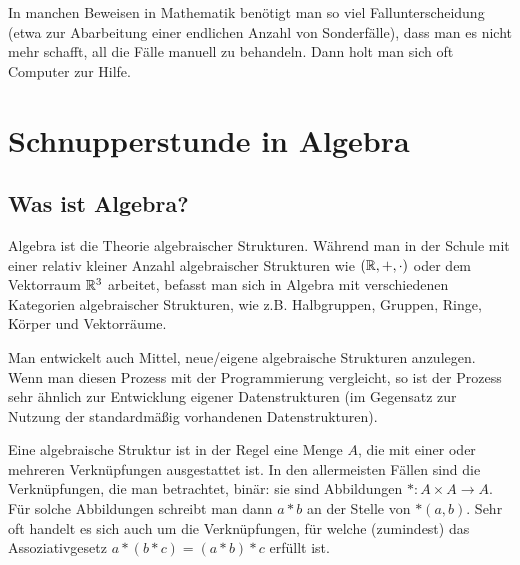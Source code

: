 \begin{bem} 
	In manchen Beweisen in Mathematik benötigt man so viel Fallunterscheidung (etwa zur Abarbeitung einer endlichen Anzahl von Sonderfälle), dass man es nicht mehr schafft, all die Fälle manuell zu behandeln. Dann holt man sich oft Computer zur Hilfe. 
\end{bem} 

\section{Schnupperstunde in Algebra} 

\subsection{Was ist Algebra?}

\begin{bem}
	Algebra ist die Theorie algebraischer Strukturen. Während man in der Schule mit einer relativ kleiner Anzahl algebraischer Strukturen wie $(\mathbb{R},+,\cdot)$ oder dem Vektorraum $\mathbb{R}^3$ arbeitet, befasst man sich in Algebra mit verschiedenen Kategorien algebraischer Strukturen, wie z.B. Halbgruppen, Gruppen, Ringe, Körper und Vektorräume. 

Man entwickelt auch Mittel,  neue/eigene algebraische Strukturen anzulegen. Wenn man diesen Prozess mit der Programmierung vergleicht, so ist der Prozess sehr ähnlich zur Entwicklung eigener Datenstrukturen (im Gegensatz zur Nutzung der standardmäßig vorhandenen Datenstrukturen). 
\end{bem} 

\begin{bem} 
	Eine algebraische Struktur ist in der Regel eine Menge $A$, die mit einer oder mehreren Verknüpfungen ausgestattet ist. In den allermeisten Fällen sind die Verknüpfungen, die man betrachtet, binär: sie sind Abbildungen $\ast : A \times A \rightarrow A$.  Für solche Abbildungen schreibt man dann $a \ast b$ an der Stelle von $\ast(a,b)$. Sehr oft handelt es sich auch um die Verknüpfungen, für welche (zumindest) das Assoziativgesetz $a \ast (b \ast c) = (a \ast b) \ast c$ erfüllt ist. 
\end{bem}	
	
